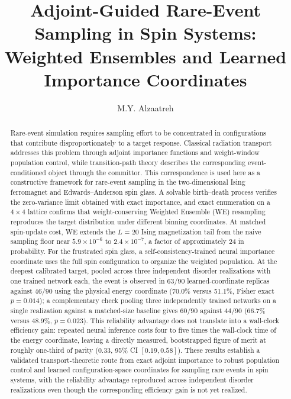 \documentclass[a4paper,fleqn]{cas-sc}
\begin{document}
\let\WriteBookmarks\relax
\def\floatpagepagefraction{1}
\def\textpagefraction{.001}

\title[mode=title]{Adjoint-Guided Rare-Event Sampling in Spin Systems: Weighted Ensembles and Learned Importance Coordinates}
\author{M.Y. Alzaatreh}\cormark[1]

\begin{abstract}
Rare-event simulation requires sampling effort to be concentrated in configurations that contribute disproportionately to a target response. Classical radiation transport addresses this problem through adjoint importance functions and weight-window population control, while transition-path theory describes the corresponding event-conditioned object through the committor. This correspondence is used here as a constructive framework for rare-event sampling in the two-dimensional Ising ferromagnet and Edwards--Anderson spin glass. A solvable birth--death process verifies the zero-variance limit obtained with exact importance, and exact enumeration on a $4\times4$ lattice confirms that weight-conserving Weighted Ensemble (WE) resampling reproduces the target distribution under different binning coordinates. At matched spin-update cost, WE extends the $L=20$ Ising magnetization tail from the naive sampling floor near $5.9\times10^{-6}$ to $2.4\times10^{-7}$, a factor of approximately 24 in probability. For the frustrated spin glass, a self-consistency-trained neural importance coordinate uses the full spin configuration to organize the weighted population. At the deepest calibrated target, pooled across three independent disorder realizations with one trained network each, the event is observed in $63/90$ learned-coordinate replicas against $46/90$ using the physical energy coordinate (70.0\% versus 51.1\%, Fisher exact $p=0.014$); a complementary check pooling three independently trained networks on a single realization against a matched-size baseline gives $60/90$ against $44/90$ (66.7\% versus 48.9\%, $p=0.023$). This reliability advantage does not translate into a wall-clock efficiency gain: repeated neural inference costs four to five times the wall-clock time of the energy coordinate, leaving a directly measured, bootstrapped figure of merit at roughly one-third of parity ($0.33$, 95\% CI $[0.19,0.58]$). These results establish a validated transport-theoretic route from exact adjoint importance to robust population control and learned configuration-space coordinates for sampling rare events in spin systems, with the reliability advantage reproduced across independent disorder realizations even though the corresponding efficiency gain is not yet realized.
\end{abstract}
\end{document}
